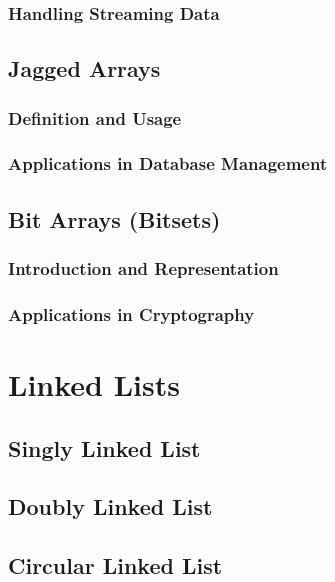 \documentclass{book}
\begin{document}
	\subsection{Handling Streaming Data}
	
	\section{Jagged Arrays}
	\subsection{Definition and Usage}
	\subsection{Applications in Database Management}
	
	\section{Bit Arrays (Bitsets)}
	\subsection{Introduction and Representation}
	\subsection{Applications in Cryptography}
	
	\chapter{Linked Lists}
	\section{Singly Linked List}
	\section{Doubly Linked List}
	\section{Circular Linked List}
	
\end{document}
